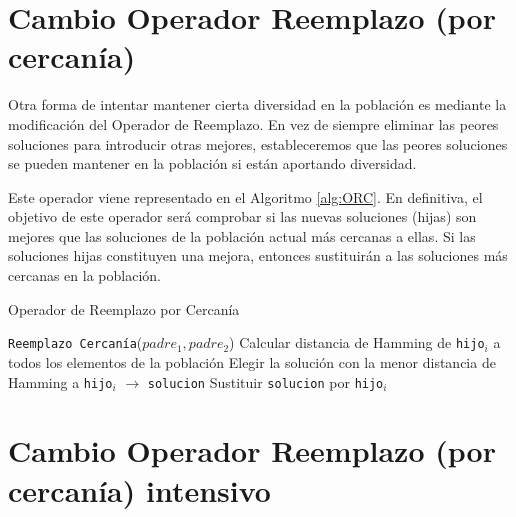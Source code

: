 \section{Cambio Operador Reemplazo (por cercanía)}

Otra forma de intentar mantener cierta diversidad en la población es mediante la modificación del Operador de Reemplazo. 
En vez de siempre eliminar las peores soluciones para introducir otras mejores, estableceremos que las peores soluciones se pueden mantener en la población si están aportando diversidad. 

Este operador viene representado en el Algoritmo \ref{alg:ORC}. 
En definitiva, el objetivo de este operador será comprobar si las nuevas soluciones (hijas) son mejores que las soluciones de la población actual más cercanas a ellas. 
Si las soluciones hijas constituyen una mejora, entonces sustituirán a las soluciones más cercanas en la población. 

\begin{algorithm}
\caption{Operador de Reemplazo por Cercanía}\label{alg:ORC}
\begin{algorithmic}[1]
\Procedure \texttt{Reemplazo Cercanía}($padre_1, padre_2$)
	\State Calcular distancia de Hamming de \texttt{hijo$_i$} a todos los elementos de la población
	\State Elegir la solución con la menor distancia de Hamming a \texttt{hijo$_i$} $\xrightarrow{}{}$ \texttt{solucion}
		\State Sustituir \texttt{solucion} por \texttt{hijo$_i$}
	\EndIf
\EndFor
\EndProcedure
\end{algorithmic}
\end{algorithm}

\section{Cambio Operador Reemplazo (por cercanía) intensivo}